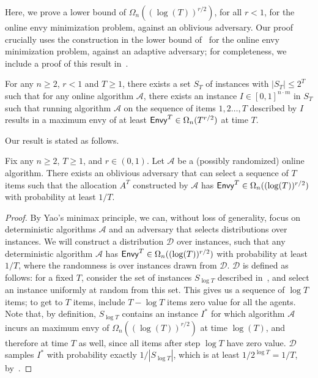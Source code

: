 Here, we prove a lower bound of $\Omega_n((\log(T))^{r/2})$, for all $r < 1$, for the online envy minimization problem, against an oblivious adversary. Our proof crucially uses the construction in the lower bound of~ \cite{benade2024fair} for the online envy minimization problem, against an adaptive adversary; for completeness, we include a proof of this result in~.


\begin{theorem}\label{theorem:adaptive-lb}
    For any $n \geq 2$, $r < 1$ and $T \geq 1$, there exists a set $S_T$ of instances with $|S_T|  \leq 2^T$ such that for any online algorithm $\mathcal{A}$, there exists an instance $I \in [0,1]^{n\cdot m}$ in $S_T$ such that running algorithm $\mathcal{A}$ on the sequence of items $1,2 \ldots, T$ described by $I$ results in a maximum envy of at least $\mathsf{Envy}^T \in \Omega_n(T^{r/2})$ at time $T$.
\end{theorem}

Our result is stated as follows.



\begin{theorem}\label{thm: envy lower bound for oblivious}
    Fix any $n \geq 2$, $T \geq 1$, and $r \in (0,1)$. Let $\mathcal{A}$ be a (possibly randomized) online algorithm. There exists an oblivious adversary that can select a sequence of $T$ items such that the allocation $A^T$ constructed by $\mathcal{A}$ has $\mathsf{Envy}^T \in \Omega_n((\log(T))^{r/2})$ with probability at least $1/T$.
\end{theorem}
\begin{proof}
    By Yao's minimax principle, we can, without loss of generality, focus on deterministic algorithms $\mathcal{A}$ and an adversary that selects distributions over instances. We will construct a distribution $\mathcal{D}$ over instances, such that any deterministic algorithm $\mathcal{A}$ has $\mathsf{Envy}^T \in \Omega_n((\log(T))^{r/2})$ with probability at least $1/T$, where the randomness is over instances drawn from $\mathcal{D}$. $\mathcal{D}$ is defined as follows: for a fixed $T$, consider the set of instances $S_{\log{T}}$ described in~, and select an instance uniformly at random from this set. This gives us a sequence of $\log{T}$ items; to get to $T$ items, include $T - \log{T}$ items zero value for all the agents. Note that, by definition, $S_{\log{T}}$ contains an instance $I^*$ for which algorithm $\mathcal{A}$ incurs an maximum envy of $\Omega_n((\log(T))^{r/2})$ at time $\log(T)$, and therefore at time $T$ as well, since all items after step $\log{T}$ have zero value. $\mathcal{D}$ samples $I^*$ with probability exactly $1/|S_{\log{T}}|$, which is at least $1/2^{\log{T}} = 1/T$, by~.
\end{proof}
